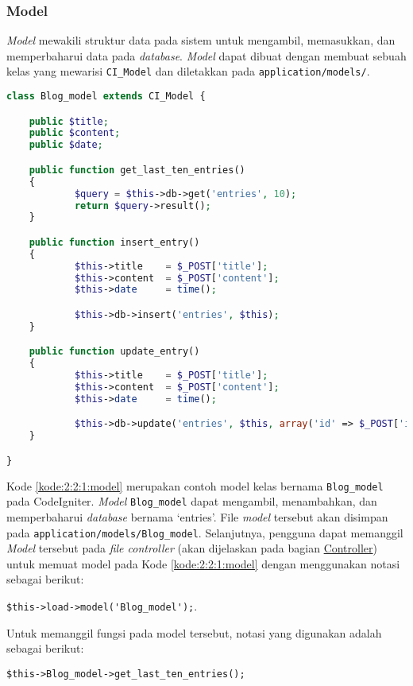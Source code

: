 \subsubsection{Model}
\label{sub:2:2:1:model}

\textit{Model} mewakili struktur data pada sistem untuk mengambil, memasukkan, dan memperbaharui data pada \textit{database}. \textit{Model} dapat dibuat dengan membuat sebuah kelas yang mewarisi \verb|CI_Model| dan diletakkan pada \verb|application/models/|.

\begin{lstlisting}[language=php, caption=Contoh \textit{model}, label=kode:2:2:1:model]
class Blog_model extends CI_Model {

	public $title;
	public $content;
	public $date;

	public function get_last_ten_entries()
	{
			$query = $this->db->get('entries', 10);
			return $query->result();
	}

	public function insert_entry()
	{
			$this->title    = $_POST['title'];
			$this->content  = $_POST['content'];
			$this->date     = time();

			$this->db->insert('entries', $this);
	}

	public function update_entry()
	{
			$this->title    = $_POST['title'];
			$this->content  = $_POST['content'];
			$this->date     = time();

			$this->db->update('entries', $this, array('id' => $_POST['id']));
	}

}
\end{lstlisting}

Kode \ref{kode:2:2:1:model} merupakan contoh model kelas bernama \verb|Blog_model| pada CodeIgniter. \textit{Model} \verb|Blog_model| dapat mengambil, menambahkan, dan memperbaharui \textit{database} bernama `entries'. File \textit{model} tersebut akan disimpan pada \verb|application/models/Blog_model|. Selanjutnya, pengguna dapat memanggil \textit{Model} tersebut pada \textit{file controller} (akan dijelaskan pada bagian \hyperref[sub:2:2:3:Controller]{Controller}) untuk memuat model pada Kode \ref{kode:2:2:1:model} dengan menggunakan notasi sebagai berikut:

\begin{center}
	\verb|$this->load->model('Blog_model');|.
\end{center}

Untuk memanggil fungsi pada model tersebut, notasi yang digunakan adalah sebagai berikut:

\begin{center}
	\verb|$this->Blog_model->get_last_ten_entries();|
\end{center}

